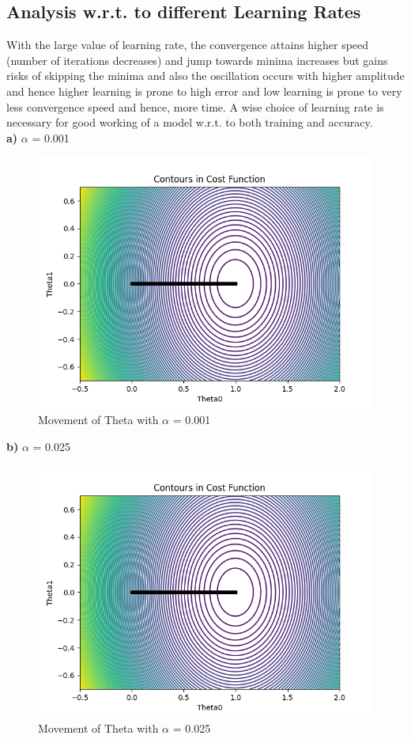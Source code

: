 \documentclass[12pt]{article}
\begin{document}
\subsection{Analysis w.r.t. to different Learning Rates}
With the large value of learning rate, the convergence attains higher speed (number of iterations decreases) and jump towards minima increases but gains risks of skipping the minima and also the oscillation occurs with higher amplitude and hence higher learning is prone to high error and low learning is prone to very less convergence speed and hence, more time. A wise choice of learning rate is necessary for good working of a model w.r.t. to both training and accuracy.\\
\textbf{a)} $\alpha$ =  0.001
\begin{figure}[H]
\centering
  \includegraphics[scale=0.75]{contourPlotLine.png}
  \caption{Movement of Theta with $\alpha$ = 0.001}
  \label{fig1C}
\end{figure}
\textbf{b)} $\alpha$ =  0.025
\begin{figure}[H]
\centering
  \includegraphics[scale=0.75]{contourPlotLine.png}
  \caption{Movement of Theta with $\alpha$ = 0.025}
  \label{fig1C}
\end{figure}
\end{document}
